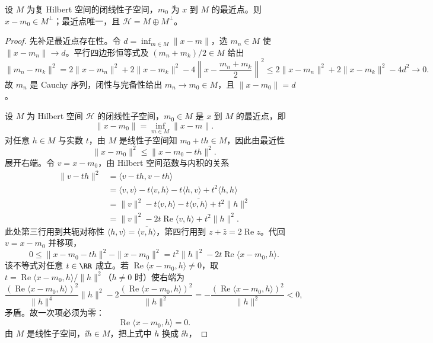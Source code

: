 \begin{proposition}[最近点的正交性与唯一性]
设 $M$ 为复 Hilbert 空间的闭线性子空间，$m_0$ 为 $x$ 到 $M$ 的最近点。则 $x-m_0\in M^\perp$；最近点唯一，且 $\mathcal H=M\oplus M^\perp$。
\end{proposition}
\begin{proof}
先补足最近点存在性。令 $d=\inf_{m\in M}\|x-m\|$，选 $m_n\in M$ 使 $\|x-m_n\|\to d$。平行四边形恒等式及 $(m_n+m_k)/2\in M$ 给出
\[
\|m_n-m_k\|^2
=2\|x-m_n\|^2+2\|x-m_k\|^2
-4\left\|x-\frac{m_n+m_k}{2}\right\|^2
\le2\|x-m_n\|^2+2\|x-m_k\|^2-4d^2\to0.
\]
故 $m_n$ 是 Cauchy 序列，闭性与完备性给出 $m_n\to m_0\in M$，且 $\|x-m_0\|=d$。

设 $M$ 为 Hilbert 空间 $\mathcal H$ 的闭线性子空间，$m_0\in M$ 是 $x$ 到 $M$ 的最近点，即
\begin{equation*}
\|x-m_0\|=\inf_{m\in M}\|x-m\|.
\end{equation*}
对任意 $h\in M$ 与实数 $t$，由 $M$ 是线性子空间知 $m_0+th\in M$，因此由最近性
\begin{equation*}
\|x-m_0\|^2\le\|x-m_0-th\|^2.
\end{equation*}
展开右端。令 $v=x-m_0$，由 Hilbert 空间范数与内积的关系
\begin{align*}
\|v-th\|^2
&=\langle v-th,v-th\rangle\\
&=\langle v,v\rangle-t\langle v,h\rangle-t\langle h,v\rangle+t^2\langle h,h\rangle\\
&=\|v\|^2-t\langle v,h\rangle-t\overline{\langle v,h\rangle}+t^2\|h\|^2\\
&=\|v\|^2-2t\operatorname{Re}\langle v,h\rangle+t^2\|h\|^2.
\end{align*}
此处第三行用到共轭对称性 $\langle h,v\rangle=\overline{\langle v,h\rangle}$，第四行用到 $z+\bar z=2\operatorname{Re}z$。代回 $v=x-m_0$ 并移项，
\begin{equation*}
0\le\|x-m_0-th\|^2-\|x-m_0\|^2
=t^2\|h\|^2-2t\operatorname{Re}\langle x-m_0,h\rangle.
\end{equation*}
该不等式对任意 $t\in\RR$ 成立。若 $\operatorname{Re}\langle x-m_0,h\rangle\ne0$，取 $t=\operatorname{Re}\langle x-m_0,h\rangle/\|h\|^2$（$h\ne0$ 时）使右端为
\[
\frac{(\operatorname{Re}\langle x-m_0,h\rangle)^2}{\|h\|^4}\|h\|^2-2\frac{(\operatorname{Re}\langle x-m_0,h\rangle)^2}{\|h\|^2}
=-\frac{(\operatorname{Re}\langle x-m_0,h\rangle)^2}{\|h\|^2}<0,
\]
矛盾。故一次项必须为零：
\begin{equation*}
\operatorname{Re}\langle x-m_0,h\rangle=0.
\end{equation*}
由 $M$ 是线性子空间，$\ii h\in M$，把上式中 $h$ 换成 $\ii h$，

\end{proof}
